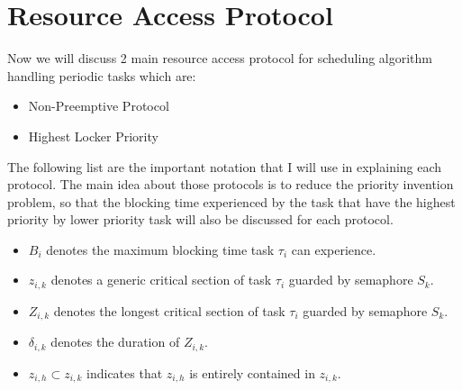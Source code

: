 \section{Resource Access Protocol}

Now we will discuss 2 main resource access protocol for scheduling algorithm handling periodic tasks which are:

\begin{itemize}
\item Non-Preemptive Protocol
\item Highest Locker Priority

\end{itemize}

 The following list are the important notation that I will use in explaining each protocol. The main idea about those protocols is to reduce the priority invention problem, so that the blocking time experienced by the task that have the highest priority by lower priority task will also be discussed for each protocol.

\begin{itemize}
\item $ B_{i} $ denotes the maximum blocking time task $ \tau_{i} $ can experience.
\item $ z_{i,k} $ denotes a generic critical section of task $ \tau_{i} $ guarded by semaphore $ S_{k} $.
\item  $ Z_{i,k} $ denotes the longest critical section of task $ \tau_{i} $ guarded by semaphore $ S_{k} $.
\item $ \delta_{i,k} $ denotes the duration of $ Z_{i,k} $.
\item $ z_{i,h} \subset z_{i,k} $ indicates that $ z_{i,h} $ is entirely contained in $ z_{i,k} $.
\end{itemize}





